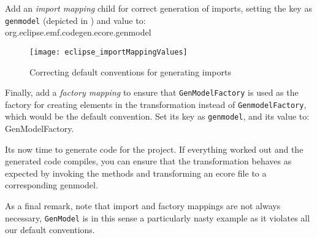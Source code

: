 \begin{stepbystep}
\item Add an \emph{import mapping} child for correct generation of imports, setting the key as \texttt{genmodel} (depicted in ) and value to: \\
{\small \ttfamily \hspace*{0.5cm} org.\-eclipse.\-emf.\-codegen.\-ecore.\-genmodel}

\vspace{0.5cm}

\begin{figure}[htbp]
\begin{centering}
\texttt{[image: eclipse\_importMappingValues]}
  \caption{Correcting default conventions for generating imports}  
  \label{eclipse:impMapValues}
\end{centering}
\end{figure} 

\item Finally, add a \emph{factory mapping} to ensure that \texttt{GenModelFactory} is used as the factory for creating elements in the
transformation instead of \texttt{Genmodel\-Factory}, which would be the default convention. Set its key as \texttt{genmodel}, and its value to:
{\small \ttfamily GenModelFactory}.

\item Its now time to generate code for the project.
If everything worked out and the generated code compiles, you can ensure that the transformation behaves as expected by invoking the methods and transforming an ecore file to a corresponding genmodel.

\end{stepbystep}


As a final remark, note that import and factory mappings are not always necessary, \texttt{GenModel} is in this sense a particularly nasty example as it violates all our default conventions.
 